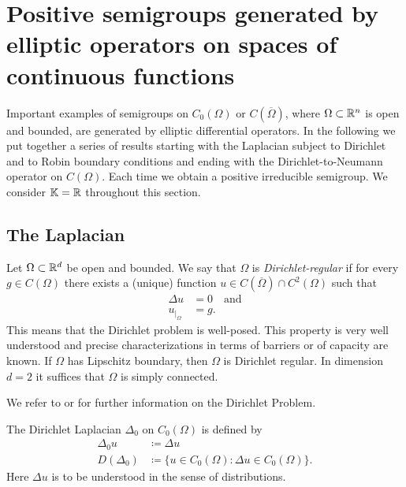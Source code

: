 
\section[Positive semigroups generated by elliptic operators]{Positive semigroups generated by elliptic operators on spaces of continuous functions}
\label{sec:eb2-1}
Important examples of semigroups on $C_{0}(\Omega)$ or $C(\overline{\Omega})$, where $\Omega \subset \mathbb{R}^n$ is open and bounded, are generated by elliptic differential operators. 
In the following we put together a series of results starting with the Laplacian subject to Dirichlet and to Robin boundary conditions and ending with the Dirichlet-to-Neumann operator on $C(\Omega)$. 
Each time we obtain a positive irreducible semigroup. We consider $\mathbb{K} = \mathbb{R}$ throughout this section.
\subsection{The Laplacian}
Let $\Omega \subset \mathbb{R}^d$ be open and bounded. We say that $\Omega$ is \emph{Dirichlet-regular} if for every $g \in C(\Omega)$ there exists a (unique) function $u \in C(\overline{\Omega}) \cap C^{2}(\Omega)$ such that
\begin{align*}
 	\Delta u &= 0 \quad \text{and} \\
	u_{|_{\Omega}} &= g.
\end{align*} 
This means that the Dirichlet problem is well-posed. 
This property is very well understood and precise characterizations in terms of barriers or of capacity are known. 
If $\Omega$ has Lipschitz boundary, then $\Omega$ is Dirichlet regular. 
In dimension $d = 2$ it suffices that $\Omega$ is simply connected.

We refer to \citet[Section 6.9]{Au23} or \citet[Section 2.8]{GT83} for further information on the Dirichlet Problem. 

The Dirichlet Laplacian $\Delta_{0}$ on $C_{0}(\Omega)$ is defined by
\begin{align*}
 	\Delta_{0} u &\coloneq \Delta u \\
 	D(\Delta_{0}) &\coloneq \{ u \in C_{0}(\Omega) \colon \Delta u \in C_{0}(\Omega) \}.
\end{align*}
Here $\Delta u$ is to be understood in the sense of distributions.

